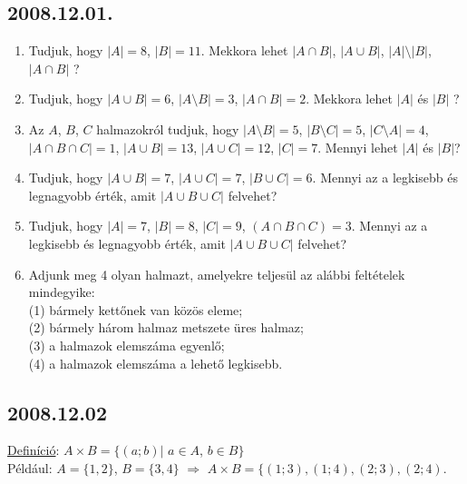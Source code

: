 \documentclass{article}
\begin{document}
\subsection*{2008.12.01.}
\begin{enumerate}
\item Tudjuk, hogy $|A|{=}8$, $|B|{=}11$. Mekkora 
lehet $|A{\cap}B|$, $|A{\cup}B|$, $|A|{\setminus}|B|$,
$|A{\cap}B|$ ?

\item Tudjuk, hogy $|A{\cup}B|{=}6$, $|A{\setminus}B|{=}3$,
$|A{\cap}B|{=}2$. Mekkora lehet $|A|$ és $|B|$ ?

\item Az $A$, $B$, $C$ halmazokról tudjuk, hogy $|A{\setminus}B|{=}5$, $|B{\setminus}C|{=}5$, $|C{\setminus}A|{=}4$, 
$|A{\cap}B{\cap}C|{=}1$, $|A{\cup}B|{=}13$, $|A{\cup}C|{=}12$, $|C|=7$.
 Mennyi lehet $|A|$ és $|B|$?

\item Tudjuk, hogy $|A{\cup}B|{=}7$, $|A{\cup}C|{=}7$, $|B{\cup}C|{=}6$.
 Mennyi az a legkisebb és legnagyobb érték, amit $|A{\cup}B{\cup}C|$ felvehet?

\item Tudjuk, hogy $|A|{=}7$, $|B|{=}8$, $|C|{=}9$, $(A{\cap}B{\cap}C){=}3$.
 Mennyi az a legkisebb és legnagyobb érték, amit $|A{\cup}B{\cup}C|$ felvehet?

\item Adjunk meg 4 olyan halmazt, amelyekre teljesül az alábbi feltételek mindegyike:
\\(1) bármely kettőnek van közös eleme;
\\(2) bármely három halmaz metszete üres halmaz;
\\(3) a halmazok elemszáma egyenlő;
\\(4) a halmazok elemszáma a lehető legkisebb.
\end{enumerate}

\subsection*{2008.12.02}
\underline{Definíció}: $A{\times}B{=}\{(a;b)|$ $a{\in}A$, $b{\in}B\}$ \\
Például: $A{=}\{1,2\}$, $B{=}\{3,4\}$ $\Rightarrow$ $A{\times}B{=}\{(1;3),(1;4),(2;3),(2;4)$.
\end{document}
